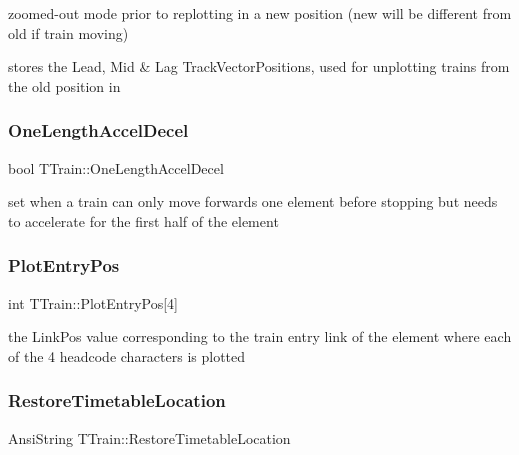 zoomed-\/out mode prior to replotting in a new position (new will be different from old if train moving) 

stores the Lead, Mid \& Lag Track\+Vector\+Positions, used for unplotting trains from the old position in \mbox{\label{class_t_train_a36dc9bd48fb78d4257fe117908829dd7}} 
\subsubsection{\texorpdfstring{One\+Length\+Accel\+Decel}{OneLengthAccelDecel}}
{\footnotesize\ttfamily bool T\+Train\+::\+One\+Length\+Accel\+Decel\hspace{0.3cm}{\ttfamily [private]}}

set when a train can only move forwards one element before stopping but needs to accelerate for the first half of the element \mbox{\label{class_t_train_ac4ff3ae93a80d230d1ddcb992b0b546a}} 
\subsubsection{\texorpdfstring{Plot\+Entry\+Pos}{PlotEntryPos}}
{\footnotesize\ttfamily int T\+Train\+::\+Plot\+Entry\+Pos\mbox{[}4\mbox{]}\hspace{0.3cm}{\ttfamily [private]}}

the Link\+Pos value corresponding to the train entry link of the element where each of the 4 headcode characters is plotted \mbox{\label{class_t_train_a2fe228470644e5b9bcc95b3e75f9bf36}} 
\subsubsection{\texorpdfstring{Restore\+Timetable\+Location}{RestoreTimetableLocation}}
{\footnotesize\ttfamily Ansi\+String T\+Train\+::\+Restore\+Timetable\+Location\hspace{0.3cm}{\ttfamily [private]}}


